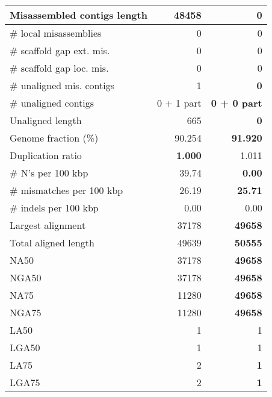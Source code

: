 \documentclass[12pt,a4paper]{article}
\begin{document}
\begin{table}[ht]
\begin{center}
\begin{tabular}{|l*{2}{|r}|}
Misassembled contigs length & 48458 & {\bf 0} \\ \hline
\# local misassemblies & 0 & 0 \\ \hline
\# scaffold gap ext. mis. & 0 & 0 \\ \hline
\# scaffold gap loc. mis. & 0 & 0 \\ \hline
\# unaligned mis. contigs & 1 & {\bf 0} \\ \hline
\# unaligned contigs & 0 + 1 part & {\bf 0 + 0 part} \\ \hline
Unaligned length & 665 & {\bf 0} \\ \hline
Genome fraction (\%) & 90.254 & {\bf 91.920} \\ \hline
Duplication ratio & {\bf 1.000} & 1.011 \\ \hline
\# N's per 100 kbp & 39.74 & {\bf 0.00} \\ \hline
\# mismatches per 100 kbp & 26.19 & {\bf 25.71} \\ \hline
\# indels per 100 kbp & 0.00 & 0.00 \\ \hline
Largest alignment & 37178 & {\bf 49658} \\ \hline
Total aligned length & 49639 & {\bf 50555} \\ \hline
NA50 & 37178 & {\bf 49658} \\ \hline
NGA50 & 37178 & {\bf 49658} \\ \hline
NA75 & 11280 & {\bf 49658} \\ \hline
NGA75 & 11280 & {\bf 49658} \\ \hline
LA50 & 1 & 1 \\ \hline
LGA50 & 1 & 1 \\ \hline
LA75 & 2 & {\bf 1} \\ \hline
LGA75 & 2 & {\bf 1} \\ \hline
\end{tabular}
\end{center}
\end{table}
\end{document}
